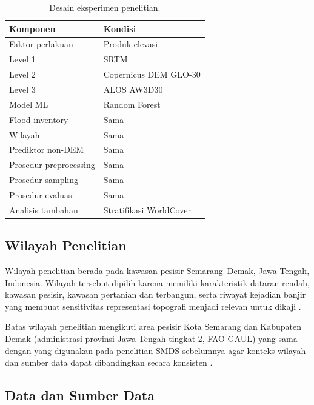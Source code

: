 \documentclass[12pt]{article}
\begin{document}
\begin{table}[ht]
\centering
\caption{Desain eksperimen penelitian.}
\label{tab:desain}
\begin{tabular}{ll}
\toprule
\textbf{Komponen} & \textbf{Kondisi} \\
\midrule
Faktor perlakuan & Produk elevasi \\
Level 1 & SRTM \\
Level 2 & Copernicus DEM GLO-30 \\
Level 3 & ALOS AW3D30 \\
Model ML & Random Forest \\
Flood inventory & Sama \\
Wilayah & Sama \\
Prediktor non-DEM & Sama \\
Prosedur preprocessing & Sama \\
Prosedur sampling & Sama \\
Prosedur evaluasi & Sama \\
Analisis tambahan & Stratifikasi WorldCover \\
\bottomrule
\end{tabular}
\end{table}

\subsection{Wilayah Penelitian}

Wilayah penelitian berada pada kawasan pesisir Semarang--Demak, Jawa Tengah,
Indonesia. Wilayah tersebut dipilih karena memiliki karakteristik dataran
rendah, kawasan pesisir, kawasan pertanian dan terbangun, serta riwayat
kejadian banjir yang membuat sensitivitas representasi topografi menjadi
relevan untuk dikaji \cite{marfai2008,Husnayaen2018,Sakina2025}.

Batas wilayah penelitian mengikuti area pesisir Kota Semarang dan Kabupaten
Demak (administrasi provinsi Jawa Tengah tingkat 2, FAO GAUL) yang sama
dengan yang digunakan pada penelitian SMDS sebelumnya agar konteks
wilayah dan sumber data dapat dibandingkan secara konsisten
\cite{hakim2026}.

\subsection{Data dan Sumber Data}
\end{document}
